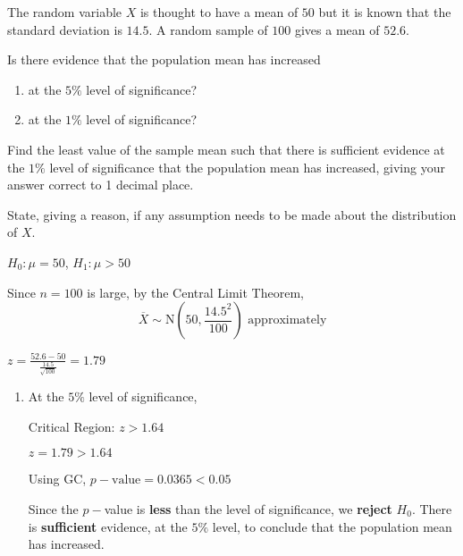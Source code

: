 \documentclass[11pt,a4paper]{book}
\begin{document}
\begin{example}

The random variable $X$ is thought to have a mean of $50$ but it
is known that the standard deviation is $14.5$. A random sample of
$100$ gives a mean of $52.6$.

Is there evidence that the population mean has increased 

\begin{enumerate}[label=(\alph*)] 

\item  at the $5\%$ level of significance?

\item  at the $1\%$ level of significance?

\end{enumerate}

Find the least value of the sample mean such that there is sufficient
evidence at the $1\%$ level of significance that the population mean
has increased, giving your answer correct to 1 decimal place.

State, giving a reason, if any assumption needs to be made about the
distribution of $X$.

\Solution

$H_{0}:\mu=50$, $H_{1}:\mu>50$

Since $n=100$ is large, by the Central Limit Theorem, 
\[
\overline{X}\sim\text{N}\left(50,\frac{14.5^{2}}{100}\right)\text{ approximately}
\]

${\displaystyle z=\frac{52.6-50}{\frac{14.5}{\sqrt{100}}}=1.79}$

\begin{enumerate}[label=(\alph*)] 

\item  At the $5\%$ level of significance, 

Critical Region: $z>1.64$

$z=1.79>1.64$

Using GC, $p-\text{value}=0.0365<0.05$

\begin{tcolorbox}[colback=white, colframe=black,boxrule=.4pt, sharpish corners]

Since the $p-$value is \textbf{less} than the level of significance,
we \textbf{reject} $H_{0}$. There is \textbf{sufficient} evidence,
at the $5\%$ level, to conclude that the population mean has increased.
\end{tcolorbox}


\end{enumerate}
\end{example}
\end{document}
